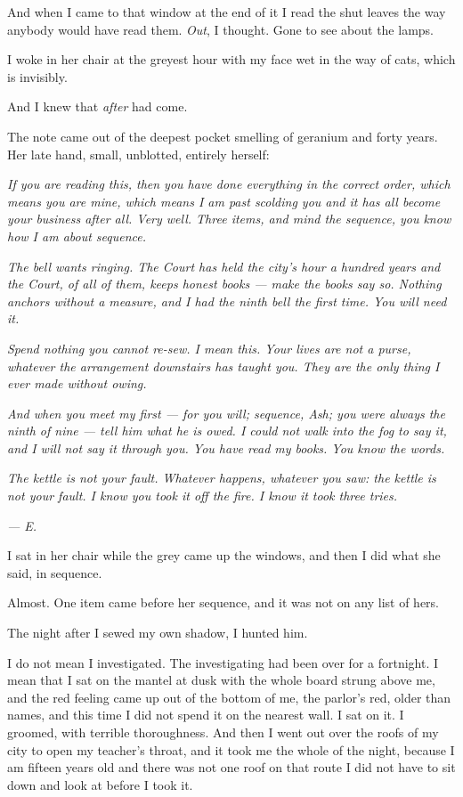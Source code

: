 And when I came to that window at the end of it I read the shut leaves the way anybody would have read them. \emph{Out}, I thought. Gone to see about the lamps.

I woke in her chair at the greyest hour with my face wet in the way of cats, which is invisibly.

And I knew that \emph{after} had come.

The note came out of the deepest pocket smelling of geranium and forty years. Her late hand, small, unblotted, entirely herself:

\emph{If you are reading this, then you have done everything in the correct order, which means you are mine, which means I am past scolding you and it has all become your business after all. Very well. Three items, and mind the sequence, you know how I am about sequence.}

\emph{The bell wants ringing. The Court has held the city's hour a hundred years and the Court, of all of them, keeps honest books --- make the books say so. Nothing anchors without a measure, and I had the ninth bell the first time. You will need it.}

\emph{Spend nothing you cannot re-sew. I mean this. Your lives are not a purse, whatever the arrangement downstairs has taught you. They are the only thing I ever made without owing.}

\emph{And when you meet my first --- for you will; sequence, Ash; you were always the ninth of nine --- tell him what he is owed. I could not walk into the fog to say it, and I will not say it through you. You have read my books. You know the words.}

\emph{The kettle is not your fault. Whatever happens, whatever you saw: the kettle is not your fault. I know you took it off the fire. I know it took three tries.}

\emph{--- E.}

I sat in her chair while the grey came up the windows, and then I did what she said, in sequence.

Almost. One item came before her sequence, and it was not on any list of hers.

The night after I sewed my own shadow, I hunted him.

I do not mean I investigated. The investigating had been over for a fortnight. I mean that I sat on the mantel at dusk with the whole board strung above me, and the red feeling came up out of the bottom of me, the parlor's red, older than names, and this time I did not spend it on the nearest wall. I sat on it. I groomed, with terrible thoroughness. And then I went out over the roofs of my city to open my teacher's throat, and it took me the whole of the night, because I am fifteen years old and there was not one roof on that route I did not have to sit down and look at before I took it.


